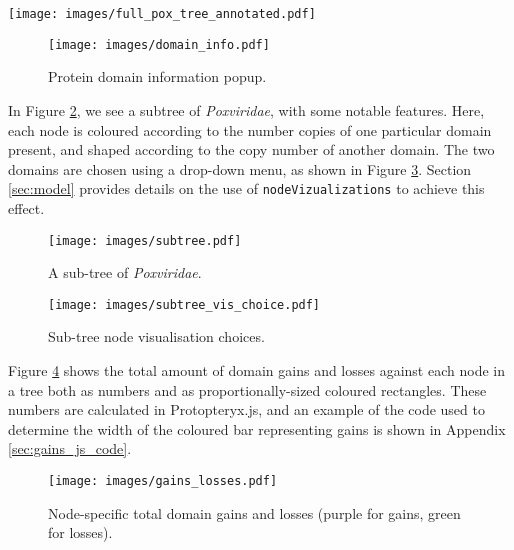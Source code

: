 \documentclass[12pt,a4paper]{article}
\begin{document}
\begin{sidewaysfigure}
\centering
\texttt{[image: images/full\_pox\_tree\_annotated.pdf]}
\caption{The full \textit{Poxviridae} phylogenetic tree, with scrollable list of protein domain names (1), scrollable list of domains originally used to create the phylogeny(2), and clickable rectangles representing domains per species (3), colour-coded according to copy number.}
\label{fig:full_pox}
\end{sidewaysfigure}
\clearpage

\begin{figure}[H]
\centering
\texttt{[image: images/domain\_info.pdf]}
\caption{Protein domain information popup.}
\label{fig:domain_info}
\end{figure}

In Figure \ref{fig:subtree}, we see a subtree of \textit{Poxviridae}, with some notable features. Here, each node is coloured according to the number copies of one particular domain present, and shaped according to the copy number of another domain. The two domains are chosen using a drop-down menu, as shown in Figure \ref{fig:domain_vis}. Section \ref{sec:model} provides details on the use of \texttt{nodeVizualizations} to achieve this effect.\\

\begin{figure}[H]
\centering
\texttt{[image: images/subtree.pdf]}
\caption{A sub-tree of \textit{Poxviridae}.}
\label{fig:subtree}
\end{figure}

\begin{figure}[H]
\centering
\texttt{[image: images/subtree\_vis\_choice.pdf]}
\caption{Sub-tree node visualisation choices.}
\label{fig:domain_vis}
\end{figure}

Figure \ref{fig:gains_losses} shows the total amount of domain gains and losses against each node in a tree both as numbers and as proportionally-sized coloured rectangles. These numbers are calculated in Protopteryx.js, and  an example of the code used to determine the width of the coloured bar representing gains is shown in Appendix \ref{sec:gains_js_code}. 

\begin{figure}[H]
\centering
\texttt{[image: images/gains\_losses.pdf]}
\caption{Node-specific total domain gains and losses (purple for gains, green for losses).}
\label{fig:gains_losses}
\end{figure}
\end{document}
